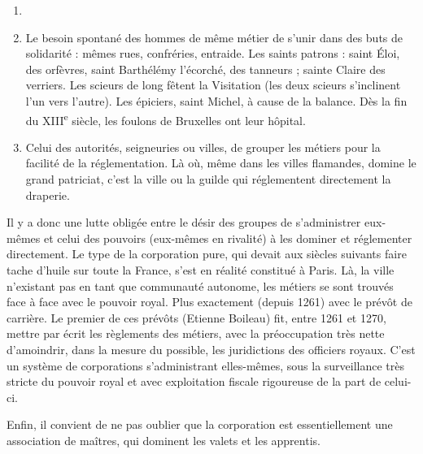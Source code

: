 \documentclass[french,twoside]{book} %
\begin{document}
\begin{enumerate}[itemsep=0pt,]
\item[] \hspace{-1.5em}{\bfseries En fait, deux causes expliquent la formation des corporations :}
\item Le besoin spontané des hommes de même métier de s’unir dans des buts de solidarité : mêmes rues, confréries, entraide. Les saints patrons : saint Éloi, des orfèvres, saint Barthélémy l’écorché, des tanneurs ; sainte Claire des verriers. Les scieurs de long fêtent la Visitation (les deux scieurs s’inclinent l’un vers l’autre). Les épiciers, saint Michel, à cause de la balance. Dès la fin du XIII\textsuperscript{e} siècle, les foulons de Bruxelles ont leur hôpital.
\item Celui des autorités, seigneuries ou villes, de grouper les métiers pour la facilité de la réglementation. Là où, même dans les villes flamandes, domine le grand patriciat, c’est la ville ou la guilde qui réglementent directement la draperie.

\end{enumerate}\noindent Il y a donc une lutte obligée entre le désir des groupes de s’administrer eux-mêmes et celui des pouvoirs (eux-mêmes en rivalité) à les dominer et réglementer directement. Le type de la corporation pure, qui devait aux siècles suivants faire tache d’huile sur toute la France, s’est en réalité constitué à Paris. Là, la ville n’existant pas en tant que communauté autonome, les métiers se sont trouvés face à face avec le pouvoir royal. Plus exactement (depuis 1261) avec le prévôt de carrière. Le premier de ces prévôts (Etienne Boileau) fit, entre 1261 et 1270, mettre par écrit les règlements des métiers, avec la préoccupation très nette d’amoindrir,  
\label{p99} dans la mesure du possible, les juridictions des officiers royaux. C’est un système de corporations s’administrant elles-mêmes, sous la surveillance très stricte du pouvoir royal et avec exploitation fiscale rigoureuse de la part de celui-ci.\par
Enfin, il convient de ne pas oublier que la corporation est essentiellement une association de maîtres, qui dominent les valets et les apprentis.\par
\end{document}
